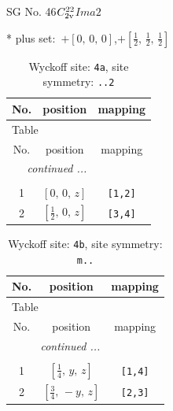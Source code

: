 \documentclass[fleqn,8pt]{jsarticle}
\begin{document}
\setcounter{MaxMatrixCols}{32}

\renewcommand{\tablename}{Table~}
\renewcommand{\figurename}{Figure~}
\begin{center}
\LARGE
SG No. 46\quad$C_{\rm 2v}^{22}$\quad$Ima2$\quad[ orthorhombic ]
\end{center}
* plus set:\,\,\,$+\left[ 0,\, 0,\, 0 \right]$,\quad $+\left[ \frac{1}{2},\, \frac{1}{2},\, \frac{1}{2} \right]$
\renewcommand{\arraystretch}{1.2}
\begin{longtable}{ccc}
\caption{Wyckoff site: {\tt 4a}, site symmetry: {\tt ..2}}
 \\
 \hline \hline
No. & position & mapping \\ \hline \endfirsthead

\multicolumn{2}{l}{\tablename\ \thetable{}} \\
 \hline \hline
No. & position & mapping \\ \hline \endhead

 \hline \hline
\multicolumn{2}{r}{\footnotesize\it continued ...} \\ \endfoot

 \hline \hline
\multicolumn{2}{r}{} \\ \endlastfoot

1 & $\left[ 0,\, 0,\, z \right]$ & {\tt [1,2]} \\ \hline
2 & $\left[ \frac{1}{2},\, 0,\, z \right]$ & {\tt [3,4]} \\
\end{longtable}
\renewcommand{\arraystretch}{1.2}
\begin{longtable}{ccc}
\caption{Wyckoff site: {\tt 4b}, site symmetry: {\tt m..}}
 \\
 \hline \hline
No. & position & mapping \\ \hline \endfirsthead

\multicolumn{2}{l}{\tablename\ \thetable{}} \\
 \hline \hline
No. & position & mapping \\ \hline \endhead

 \hline \hline
\multicolumn{2}{r}{\footnotesize\it continued ...} \\ \endfoot

 \hline \hline
\multicolumn{2}{r}{} \\ \endlastfoot

1 & $\left[ \frac{1}{4},\, y,\, z \right]$ & {\tt [1,4]} \\ \hline
2 & $\left[ \frac{3}{4},\, - y,\, z \right]$ & {\tt [2,3]} \\
\end{longtable}
\end{document}
